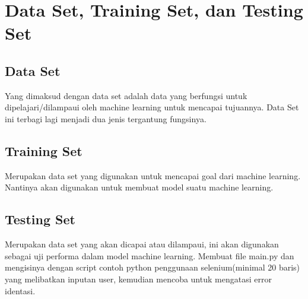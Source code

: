 \section{Data Set, Training Set, dan Testing Set}
\subsection{Data Set}
\par
Yang dimaksud dengan data set adalah data yang berfungsi untuk dipelajari/dilampaui oleh machine learning untuk mencapai tujuannya. Data Set ini terbagi lagi menjadi dua jenis tergantung fungsinya.
\subsection{Training Set}
\par
Merupakan data set yang digunakan untuk mencapai goal dari machine learning. Nantinya akan digunakan untuk membuat model suatu machine learning.
\subsection{Testing Set}
\par
Merupakan data set yang akan dicapai atau dilampaui, ini akan digunakan sebagai uji performa dalam model machine learning.
Membuat file main.py dan mengisinya dengan script contoh python penggunaan selenium(minimal 20 baris) yang melibatkan inputan user, kemudian mencoba untuk mengatasi error identasi.

